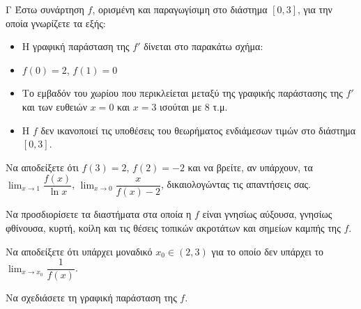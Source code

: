 \begin{thema}{Γ}
Έστω συνάρτηση $f$, ορισμένη και παραγωγίσιμη στο διάστημα $[0, 3]$, για την οποία γνωρίζετε τα εξής:

\begin{itemize}
    \item Η γραφική παράσταση της $f'$ δίνεται στο παρακάτω σχήμα:
\end{itemize}

\begin{center}
\end{center}

\begin{itemize}
    \item $f(0) = 2$, $f(1) = 0$
    \item Το εμβαδόν του χωρίου που περικλείεται μεταξύ της γραφικής παράστασης της $f'$ και των ευθειών $x = 0$ και $x = 3$ ισούται με $8$ τ.μ.
    \item Η $f$ δεν ικανοποιεί τις υποθέσεις του θεωρήματος ενδιάμεσων τιμών στο διάστημα $[0, 3]$.
\end{itemize}

\begin{erwthma}
    \item Να αποδείξετε ότι $f(3) = 2$, $f(2) = -2$ και να βρείτε, αν υπάρχουν, τα $\displaystyle\lim_{x \to 1} \dfrac{f(x)}{\ln x}$, $\displaystyle\lim_{x \to 0} \dfrac{x}{f(x) - 2}$, δικαιολογώντας τις απαντήσεις σας. 
    \item Να προσδιορίσετε τα διαστήματα στα οποία η $f$ είναι γνησίως αύξουσα, γνησίως φθίνουσα, κυρτή, κοίλη και τις θέσεις τοπικών ακροτάτων και σημείων καμπής της $f$. 
    \item Να αποδείξετε ότι υπάρχει μοναδικό $x_0 \in (2, 3)$ για το οποίο δεν υπάρχει το $\displaystyle\lim_{x \to x_0} \dfrac{1}{f(x)}$. 
    \item Να σχεδιάσετε τη γραφική παράσταση της $f$. 
\end{erwthma}
\end{thema}
